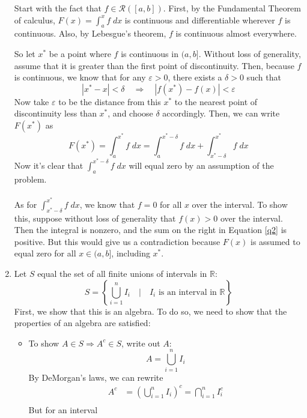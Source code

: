 \documentclass[12pt]{article}
\theoremstyle{plain}
\theoremstyle{definition}
\theoremstyle{remark}
\begin{document}
\begin{enumerate}
Start with the fact that $f\in\mathscr{R}([a,b])$. First, by the Fundamental Theorem of calculus, $F(x)=\int^x_a f\;dx$ is continuous and differentiable wherever $f$ is continuous. Also, by Lebesgue's theorem, $f$ is continuous almost everywhere. 

So let $x^*$ be a point where $f$ is continuous in $(a,b]$. Without loss of generality, assume that it is greater than the first point of discontinuity. Then, because $f$ is continuous, we know that for any $\varepsilon>0$, there exists a $\delta>0$ such that 
\[
    |x^*-x|<\delta \quad \Rightarrow \quad |f(x^*)-f(x)|<\varepsilon
\]
\newpage
Now take $\varepsilon$ to be the distance from this $x^*$ to the nearest point of discontinuity less than $x^*$, and choose $\delta$ accordingly. Then, we can write $F(x^*)$ as 
\begin{equation}
    \label{q2}
    F(x^*) = \int^{x^*}_a f\;dx = 
    \int^{x^* - \delta}_a f\;dx +
    \int^{x^*}_{x^* - \delta} f\;dx
\end{equation}
Now it's clear that $\int^{x^* - \delta}_a f\;dx$ will equal zero by an assumption of the problem. 
\\
\\
As for $\int^{x^*}_{x^* - \delta} f\;dx$, we know that $f=0$ for all $x$ over the interval. To show this, suppose without loss of generality that $f(x)>0$ over the interval. Then the integral is nonzero, and the sum on the right in Equation \ref{q2} is positive. But this would give us a contradiction because $F(x)$ is assumed to equal zero for all $x\in(a,b]$, including $x^*$.
    
\item 
Let $S$ equal the set of all finite unions of intervals in $\mathbb{R}$:
\[
    S = \left\{ \bigcup^n_{i=1} I_i \quad | \quad
    I_i \text{ is an interval in }  \mathbb{R} 
    \right\}
\]
First, we show that this is an algebra. To do so, we need to show that the properties of an algebra are satisfied:
\begin{itemize}
    \item To show $A\in{S}\Rightarrow A^c\in S$, write out $A$:
    \[ 
        A = \bigcup^n_{i=1} I_i  
    \]
    By DeMorgan's laws, we can rewrite
    \begin{align*}
        A^c &= \left(\bigcup^n_{i=1} I_i \right)^c 
        = \bigcap^n_{i=1} I^c_i  \\
    \end{align*}
    But for an interval 
    
\end{itemize}


\end{enumerate}
\end{document}
